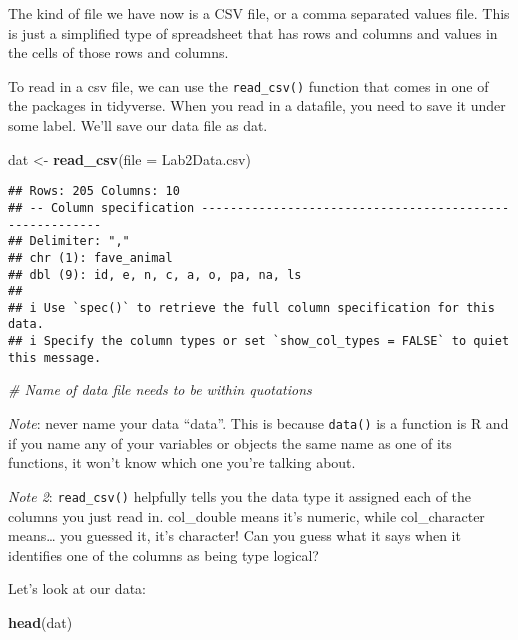 \documentclass[
]{article}
\newenvironment{Shaded}{\begin{snugshade}}{\end{snugshade}}
\newcommand{\AttributeTok}[1]{\textcolor[rgb]{0.13,0.29,0.53}{#1}}
\newcommand{\CommentTok}[1]{\textcolor[rgb]{0.56,0.35,0.01}{\textit{#1}}}
\newcommand{\FunctionTok}[1]{\textcolor[rgb]{0.13,0.29,0.53}{\textbf{#1}}}
\newcommand{\NormalTok}[1]{#1}
\newcommand{\OtherTok}[1]{\textcolor[rgb]{0.56,0.35,0.01}{#1}}
\newcommand{\StringTok}[1]{\textcolor[rgb]{0.31,0.60,0.02}{#1}}
\begin{document}
The kind of file we have now is a CSV file, or a comma separated values
file. This is just a simplified type of spreadsheet that has rows and
columns and values in the cells of those rows and columns.

To read in a csv file, we can use the \texttt{read\_csv()} function that
comes in one of the packages in tidyverse. When you read in a datafile,
you need to save it under some label. We'll save our data file as dat.

\begin{Shaded}
\begin{Highlighting}[]
\NormalTok{dat }\OtherTok{\textless{}{-}} \FunctionTok{read\_csv}\NormalTok{(}\AttributeTok{file =} \StringTok{\textquotesingle{}Lab2Data.csv\textquotesingle{}}\NormalTok{)}
\end{Highlighting}
\end{Shaded}

\begin{verbatim}
## Rows: 205 Columns: 10
## -- Column specification --------------------------------------------------------
## Delimiter: ","
## chr (1): fave_animal
## dbl (9): id, e, n, c, a, o, pa, na, ls
## 
## i Use `spec()` to retrieve the full column specification for this data.
## i Specify the column types or set `show_col_types = FALSE` to quiet this message.
\end{verbatim}

\begin{Shaded}
\begin{Highlighting}[]
  \CommentTok{\# Name of data file needs to be within quotations}
\end{Highlighting}
\end{Shaded}

\emph{Note}: never name your data ``data''. This is because
\texttt{data()} is a function is R and if you name any of your variables
or objects the same name as one of its functions, it won't know which
one you're talking about.

\emph{Note 2}: \texttt{read\_csv()} helpfully tells you the data type it
assigned each of the columns you just read in. col\_double means it's
numeric, while col\_character means\ldots{} you guessed it, it's
character! Can you guess what it says when it identifies one of the
columns as being type logical?

Let's look at our data:

\begin{Shaded}
\begin{Highlighting}[]
\FunctionTok{head}\NormalTok{(dat) }
\end{Highlighting}
\end{Shaded}
\end{document}
